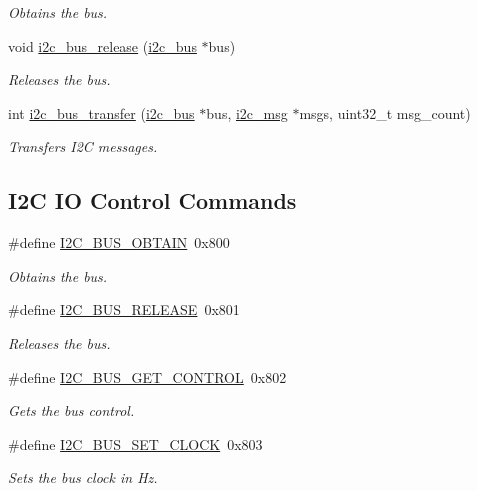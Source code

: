 \begin{DoxyCompactItemize}
\begin{DoxyCompactList}\small\item\em Obtains the bus. \end{DoxyCompactList}\item 
void \mbox{\hyperlink{group__I2CBus_gabf677e37011d97c32fc2253004fe1a72}{i2c\+\_\+bus\+\_\+release}} (\mbox{\hyperlink{structi2c__bus}{i2c\+\_\+bus}} $\ast$bus)
\begin{DoxyCompactList}\small\item\em Releases the bus. \end{DoxyCompactList}\item 
int \mbox{\hyperlink{group__I2CBus_ga0b55fa0b52b40128fdc2d5fbcfe317dc}{i2c\+\_\+bus\+\_\+transfer}} (\mbox{\hyperlink{structi2c__bus}{i2c\+\_\+bus}} $\ast$bus, \mbox{\hyperlink{structi2c__msg}{i2c\+\_\+msg}} $\ast$msgs, uint32\+\_\+t msg\+\_\+count)
\begin{DoxyCompactList}\small\item\em Transfers I2C messages. \end{DoxyCompactList}\end{DoxyCompactItemize}
\subsection*{I2C IO Control Commands}
\begin{DoxyCompactItemize}
\item 
\#define \mbox{\hyperlink{group__I2CBus_gad159039fe8e5bab657e71ce875d79527}{I2\+C\+\_\+\+B\+U\+S\+\_\+\+O\+B\+T\+A\+IN}}~0x800
\begin{DoxyCompactList}\small\item\em Obtains the bus. \end{DoxyCompactList}\item 
\#define \mbox{\hyperlink{group__I2CBus_ga31412b5ae3e35968e3f9ed8aff9e4c39}{I2\+C\+\_\+\+B\+U\+S\+\_\+\+R\+E\+L\+E\+A\+SE}}~0x801
\begin{DoxyCompactList}\small\item\em Releases the bus. \end{DoxyCompactList}\item 
\#define \mbox{\hyperlink{group__I2CBus_gacda477916c6ce927a3999d80b515af73}{I2\+C\+\_\+\+B\+U\+S\+\_\+\+G\+E\+T\+\_\+\+C\+O\+N\+T\+R\+OL}}~0x802
\begin{DoxyCompactList}\small\item\em Gets the bus control. \end{DoxyCompactList}\item 
\#define \mbox{\hyperlink{group__I2CBus_gaa58f3eb1f3998bd0dd31db7768d4abcf}{I2\+C\+\_\+\+B\+U\+S\+\_\+\+S\+E\+T\+\_\+\+C\+L\+O\+CK}}~0x803
\begin{DoxyCompactList}\small\item\em Sets the bus clock in Hz. \end{DoxyCompactList}\end{DoxyCompactItemize}


